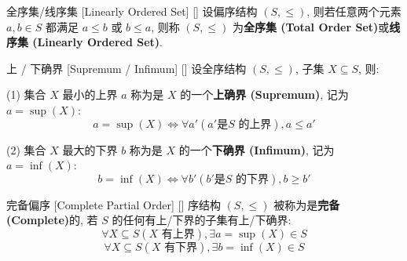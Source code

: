 \documentclass[UTF8]{ctexart}
\begin{document}
        \begin{dfn}
            []
            {全序集/线序集}
            [Linearly Ordered Set]
            []
            设偏序结构 \((S,\leq)\), 则若任意两个元素 \(a,b\in S\) 都满足 \(a\leq b\) 或 \(b\leq a\), 则称 \((S,\leq)\) 为\textbf{全序集 (Total Order Set)}或\textbf{线序集 (Linearly Ordered Set)}. 
        \end{dfn}
        
        \begin{dfn}
            []
            {上 / 下确界}
            [Supremum / Infimum]
            []
            设全序结构 \((S,\leq)\), 子集 \(X\subseteq S\), 则: 
            
            (1) 集合 \(X\) 最小的上界 \(a\) 称为是 \(X\) 的一个\textbf{上确界  (Supremum)}, 记为 \(a=\sup(X)\): 
            \[a=\sup(X)\iff\forall a'(a' \text{是} S\text{ 的上界}), a\leq a'\]
            
            (2) 集合 \(X\) 最大的下界 \(b\) 称为是 \(X\) 的一个\textbf{下确界  (Infimum)}, 记为 \(a=\inf(X)\): 
            \[b=\inf(X)\iff\forall b'(b' \text{是} S\text{ 的下界}), b\geq b'\]
        \end{dfn}
        
        \begin{dfn}
            []
            {完备偏序}
            [Complete Partial Order]
            []
            序结构 \((S,\leq)\) 被称为是\textbf{完备 (Complete)}的, 若 \(S\) 的任何有上/下界的子集有上/下确界: 
            \[\forall X\subseteq S(X\text{ 有上界}), \exists a=\sup(X)\in S\]
            \[\forall X\subseteq S(X\text{ 有下界}), \exists b=\inf(X)\in S\]
        \end{dfn}
    
\end{document}
